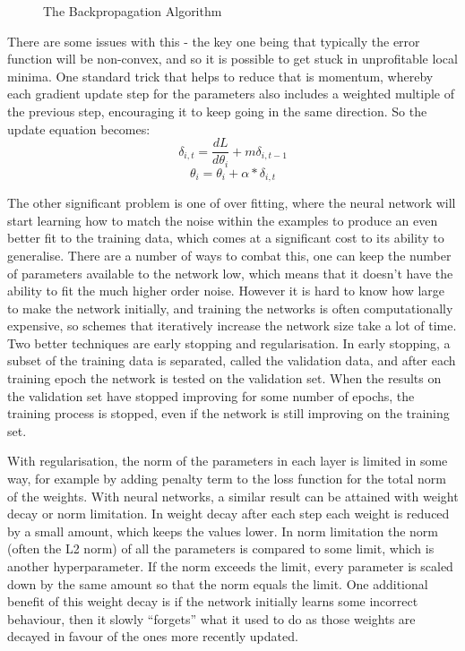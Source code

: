 \begin{figure}
\centering

\caption{The Backpropagation Algorithm}
\label{fig:backprop}
\end{figure}

There are some issues with this - the key one being  that typically the error function will be non-convex, and so it is possible to get stuck in unprofitable local minima. One standard trick that helps to reduce that is momentum, whereby each gradient update step for the parameters also includes a weighted multiple of the previous step, encouraging it to keep going in the same direction. So the update equation becomes:
\begin{equation*}
\delta_{i,t} = \frac{dL}{d\theta_i} + m\delta_{i,t-1}
\end{equation*}
\begin{equation}
\theta_i = \theta_i  + \alpha * \delta_{i,t}
\end{equation}

The other significant problem is one of over fitting, where the neural network will start learning how to match the noise within the examples to produce an even better fit to the training data, which comes at a significant cost to its ability to generalise. There are a number of ways to combat this, one can keep the number of parameters available to the network low, which means that it doesn't have the ability to fit the much higher order noise. However it is hard to know how large to make the network initially, and training the networks is often computationally expensive, so schemes that iteratively increase the network size take a lot of time. Two better techniques are early stopping and regularisation. In early stopping, a subset of the training data is separated, called the validation data, and after each training epoch the network is tested on the validation set. When the results on the validation set have stopped improving for some number of epochs, the training process is stopped, even if the network is still improving on the training set.

With regularisation, the norm of the parameters in each layer is limited in some way, for example by adding penalty term to the loss function for the total norm of the weights. With neural networks, a similar result can be attained with weight decay or norm limitation. In weight decay after each step each weight is reduced by a small amount, which keeps the values lower. In norm limitation the norm (often the L2 norm) of all the parameters is compared to some limit, which is another hyperparameter. If the norm exceeds the limit, every parameter is scaled down by the same amount so that the norm equals the limit. One additional benefit of this weight decay is if the network initially learns some incorrect behaviour, then it slowly ``forgets'' what it used to do as those weights are decayed in favour of the ones more recently updated.

